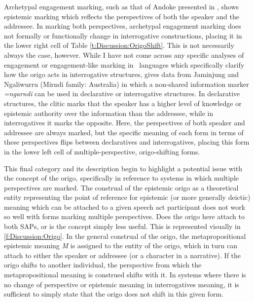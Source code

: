 Archetypal engagement marking, such as that of Andoke presented in , shows epistemic marking which reflects the perspectives of both the speaker and the addressee. In marking both perspectives, archetypal engagement marking does not formally or functionally change in interrogative constructions, placing it in the lower right cell of Table \ref{t:Discussion:OrigoShift}. This is not necessarily always the case, however. While I have not come across any specific analyses of engagement or engagement-like marking in \lfam\ languages which specifically clarify how the origo acts in interrogative structures,  gives data from Jaminjung and Ngaliwurru (Mirndi family: Australia) in which a non-shared information marker \textit{=ngarndi} can be used in declarative or interrogative structures. In declarative structures, the clitic marks that the speaker has a higher level of knowledge or epistemic authority over the information than the addressee, while in interrogatives it marks the opposite. Here, the perspectives of both speaker and addressee are always marked, but the specific meaning of each form in terms of these perspectives flips between declaratives and interrogatives, placing this form in the lower left cell of multiple-perspective, origo-shifting forms.

This final category and its description begin to highlight a potential issue with the concept of the origo, specifically in reference to systems in which multiple perspectives are marked. The construal of the epistemic origo as a theoretical entity representing the point of reference for epistemic (or more generally deictic) meaning which can be attached to a given speech act participant does not work so well with forms marking multiple perspectives. Does the origo here attach to both SAPs, or is the concept simply less useful. This is represented visually in \ref{f:Discussion:Origo}. In the general construal of the origo, the metapropositional epistemic meaning \textit{M} is assigned to the entity of the origo, which in turn can attach to either the speaker or addressee (or a character in a narrative). If the origo shifts to another individual, the perspective from which the metapropositional meaning is construed shifts with it. In systems where there is no change of perspective or epistemic meaning in interrogatives meaning, it is sufficient to simply state that the origo does not shift in this given form.


